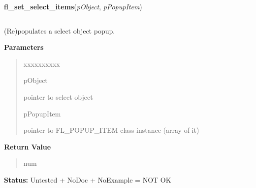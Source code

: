 \hspace{.8\funcindent}\begin{boxedminipage}{\funcwidth}

    \raggedright \textbf{fl\_set\_select\_items}(\textit{pObject}, \textit{pPopupItem})

    \vspace{-1.5ex}

    \rule{\textwidth}{0.5\fboxrule}
\setlength{\parskip}{2ex}
    (Re)populates a select object popup.

\setlength{\parskip}{1ex}
      \textbf{Parameters}
      \vspace{-1ex}

      \begin{quote}
        \begin{Ventry}{xxxxxxxxxx}

          \item[pObject]

          pointer to select object

          \item[pPopupItem]

          pointer to FL\_POPUP\_ITEM class instance (array of it)

        \end{Ventry}

      \end{quote}

      \textbf{Return Value}
    \vspace{-1ex}

      \begin{quote}
      num

      \end{quote}

\textbf{Status:} Untested + NoDoc + NoExample = NOT OK



    \end{boxedminipage}

    \label{xformslib:library:fl_get_select_popup}

    \vspace{0.5ex}

